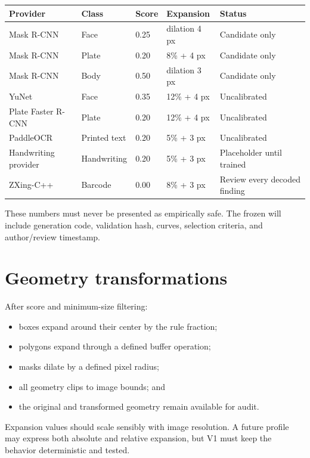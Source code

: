 \begin{tabularx}{\textwidth}{@{}L{31mm}L{31mm}L{22mm}L{23mm}Y@{}}
\toprule
\textbf{Provider} & \textbf{Class} & \textbf{Score} & \textbf{Expansion} & \textbf{Status} \\
\midrule
Mask R-CNN & Face & 0.25 & dilation 4 px & Candidate only \\
Mask R-CNN & Plate & 0.20 & 8\% + 4 px & Candidate only \\
Mask R-CNN & Body & 0.50 & dilation 3 px & Candidate only \\
YuNet & Face & 0.35 & 12\% + 4 px & Uncalibrated \\
Plate Faster R-CNN & Plate & 0.20 & 12\% + 4 px & Uncalibrated \\
PaddleOCR & Printed text & 0.20 & 5\% + 3 px & Uncalibrated \\
Handwriting provider & Handwriting & 0.20 & 5\% + 3 px & Placeholder until trained \\
ZXing-C++ & Barcode & 0.00 & 8\% + 3 px & Review every decoded finding \\
\bottomrule
\end{tabularx}

These numbers must never be presented as empirically safe. The frozen  will include generation code, validation hash, curves, selection criteria, and author/review timestamp.

\section{Geometry transformations}

After score and minimum-size filtering:

\begin{itemize}[leftmargin=6mm]
  \item boxes expand around their center by the rule fraction;
  \item polygons expand through a defined buffer operation;
  \item masks dilate by a defined pixel radius;
  \item all geometry clips to image bounds; and
  \item the original and transformed geometry remain available for audit.
\end{itemize}

Expansion values should scale sensibly with image resolution. A future profile may express both absolute and relative expansion, but V1 must keep the behavior deterministic and tested.

